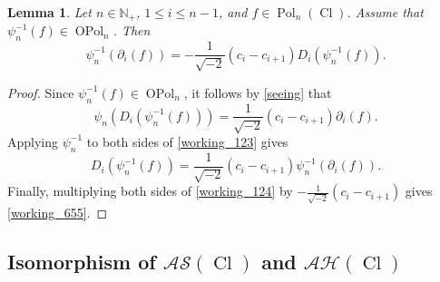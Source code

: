 \documentclass[11pt]{amsart}
\newtheorem{lem}[theo]{Lemma}
\theoremstyle{definition}
\numberwithin{equation}{section}
\begin{document}
\begin{lem} \label{working_656}
Let $ n \in \mathbb{N}_{+} $, $ 1 \leq i \leq n-1 $, and $ f \in \operatorname{Pol}_{n}(\operatorname{Cl}) $. Assume that $ \psi_{n}^{-1}(f) \in \operatorname{OPol}_{n} $. Then 
\begin{equation} \label{working_655}
\psi_{n}^{-1}(\partial_{i}(f)) = -\frac{1}{\sqrt{-2}}(c_{i}-c_{i+1})D_{i}(\psi_{n}^{-1}(f)).
\end{equation}
\end{lem}

\begin{proof}
Since $ \psi_{n}^{-1}(f) \in \operatorname{OPol}_{n} $, it follows by \cref{seeing} that
\begin{equation} \label{working_123}
\psi_{n}(D_{i}(\psi_{n}^{-1}(f))) = \frac{1}{\sqrt{-2}}(c_{i}-c_{i+1})\partial_{i}(f).
\end{equation}
Applying $ \psi_{n}^{-1} $ to both sides of \cref{working_123} gives
\begin{equation} \label{working_124}
D_{i}(\psi_{n}^{-1}(f)) = \frac{1}{\sqrt{-2}}(c_{i}-c_{i+1})\psi_{n}^{-1}(\partial_{i}(f)).
\end{equation}
Finally, multiplying both sides of \cref{working_124} by $ -\frac{1}{\sqrt{-2}}(c_{i}-c_{i+1}) $ gives \cref{working_655}.
\end{proof}

\subsection{Isomorphism of $ \mathcal{AS}(\operatorname{Cl}) $ and $ \mathcal{AH}(\operatorname{Cl}) $}
\end{document}

